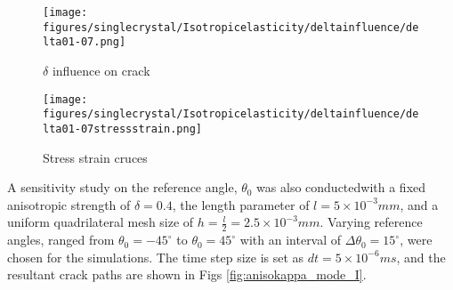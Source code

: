 \documentclass[3p,10pt,sort&compress]{elsarticle}
\begin{document}
\begin{figure*}[!htb]
	\centering
  \begin{subfigure}{0.45\textwidth}
		\texttt{[image: figures/singlecrystal/Isotropicelasticity/deltainfluence/delta01-07.png]}
		\caption{$\delta$ influence on crack}
	  \label{fig:deltacrackinf}
	\end{subfigure}
	\begin{subfigure}{0.45\textwidth}
		\texttt{[image: figures/singlecrystal/Isotropicelasticity/deltainfluence/delta01-07stressstrain.png]}
		\caption{Stress strain cruces}
	  \label{fig:deltastressinf}
	\end{subfigure}
	\caption{Sensitivity study of anisotropic strength $\delta$, the final crack paths after post-processing induced by different anisotropic strength $\delta$, ranging from 0.1 to 0.7 with interval of 0.1, are shown in Fig. \ref{fig:deltacrackinf}; The resultant stress strain curves are shown in \ref{fig:deltastressinf}}
\end{figure*}

A sensitivity study on the reference angle, $\theta_0$ was also conductedwith a fixed anisotropic strength of $\delta = 0.4$, the length parameter of $l=5\times10^{-3}mm$, and a uniform quadrilateral mesh size of $h=\frac{l}{2}=2.5\times10^{-3}mm$. Varying reference angles, ranged from $\theta_0 = -45^\circ$ to $\theta_0=45^\circ$ with an interval of $\Delta \theta_0 = 15^\circ$, were chosen for the simulations. The time step size is set as $dt=5\times10^{-6}ms$, and the resultant crack paths are shown in Figs \ref{fig:anisokappa_mode_I}.
\end{document}
